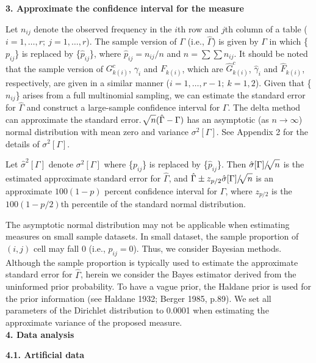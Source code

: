 \documentclass[a4j,12pt]{article}
\begin{document}
\noindent \textbf{\large 3. Approximate the confidence interval for the measure}

Let $n_{ij}$ denote the observed frequency in the $i$th row and $j$th column of a table ($i =1, \ldots, r;~j = 1, \ldots, r$).
The sample version of $\Gamma$ (i.e., $\hat{\Gamma}$) is given by $\Gamma$ in which \{$p_{ij}$\} is replaced by \{$\hat{p}_{ij}$\}, where $\hat{p}_{ij} = n_{ij}/n$ and $n = \sum \sum n_{ij}$.
It should be noted that the sample version of $G^c_{k(i)}$, $\gamma_i$ and $F_{k(i)}$, which are $\hat{G}^c_{k(i)}$, $\hat{\gamma}_i$ and $\hat{F}_{k(i)}$, respectively, are given in a similar manner ($i=1, \ldots, r-1;~k=1, 2$).
Given that \{$n_{ij}$\} arises from a full multinomial sampling, we can estimate the standard error for $\hat{\Gamma}$ and construct a large-sample confidence interval for $\Gamma$. 
The delta method can approximate the standard error. 
$\sqrt[]{\mathstrut n}(\hat{\Gamma} - \Gamma)$ has an asymptotic (as $n \rightarrow \infty$) normal distribution with mean zero and variance $\sigma^2[ \Gamma ]$.
See Appendix 2 for the details of $\sigma^2[ \Gamma ]$.

Let $\hat{\sigma}^2[ \Gamma ]$ denote $\sigma^2[ \Gamma ]$ where \{$p_{ij}$\} is replaced by \{$\hat{p}_{ij}$\}.
Then $\hat{\sigma} [ \Gamma ]/\sqrt[]{\mathstrut n}$ is the estimated approximate standard error for $\hat{\Gamma}$, and 
$\hat{\Gamma} \pm z_{p/2} \hat{\sigma} [ \Gamma ]/\sqrt[]{\mathstrut n}$ is an approximate $100(1-p)$ percent confidence interval for $\Gamma$,
where $z_{p/2}$ is the $100 (1-p/2)$th percentile of the standard normal distribution.

The asymptotic normal distribution may not be applicable when estimating measures on small sample datasets. 
In small dataset, the sample proportion of $(i,  j)$ cell may fall 0 (i.e., $\hat{p}_{ij} = 0$).
Thus, we consider Bayesian methods. 
Although the sample proportion is typically used to estimate the approximate standard error for $\hat{\Gamma}$, herein we consider the Bayes estimator derived from the uninformed prior probability. 
To have a vague prior, the Haldane prior is used for the prior information (see Haldane 1932; Berger 1985, p.89). 
We set all parameters of the Dirichlet distribution to 0.0001 when estimating the approximate variance of the proposed measure.
\\


\noindent \textbf{\large 4. Data analysis}

\noindent \textbf{\large 4.1. Artificial data}
\end{document}
